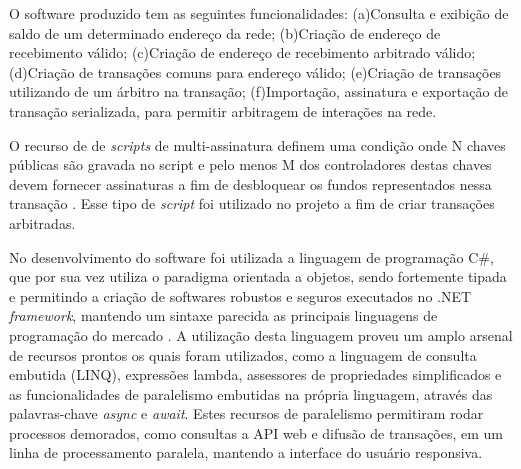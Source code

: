 \documentclass[
	article,			%
	11pt,				%
	oneside,			%
	a4paper,			%
	chapter=TITLE,		%
	section=TITLE,		%
	subsection=TITLE,	%
	subsubsection=TITLE, %
	english,			%
	brazil,				%
	sumario=tradicional
	]{ifrs-artigo-abntex2}
\begin{document}
O software produzido tem as seguintes funcionalidades: (a)Consulta e exibição de saldo de um determinado endereço da rede; (b)Criação de endereço de recebimento válido; (c)Criação de endereço de recebimento arbitrado válido; (d)Criação de transações comuns para endereço válido; (e)Criação de transações utilizando de um árbitro na transação; (f)Importação, assinatura e exportação de transação serializada, para permitir arbitragem de interações na rede.







O recurso de de \textit{scripts} de multi-assinatura definem uma condição onde N chaves públicas são gravada no script e pelo menos M dos controladores destas chaves devem fornecer assinaturas a fim de desbloquear os fundos representados nessa transação \cite{masterBit}. Esse tipo de \textit{script} foi utilizado no projeto a fim de criar transações arbitradas.


No desenvolvimento do software foi utilizada a linguagem de programação C{\#}, que por sua vez utiliza o paradigma orientada a objetos, sendo fortemente tipada e permitindo a criação de softwares robustos e seguros executados no .NET \textit{framework}, mantendo um sintaxe parecida as principais linguagens de programação do mercado  \cite{wagner2015}. A utilização desta linguagem proveu um amplo arsenal de recursos prontos os quais foram utilizados, como a linguagem de consulta embutida (LINQ), expressões lambda, assessores de propriedades simplificados e as funcionalidades de paralelismo embutidas na própria linguagem, através das palavras-chave \textit{async} e \textit{await}.
Estes recursos de paralelismo permitiram rodar processos demorados, como consultas a API web e difusão de transações, em um linha de processamento paralela, mantendo a interface do usuário responsiva.

\end{document}
